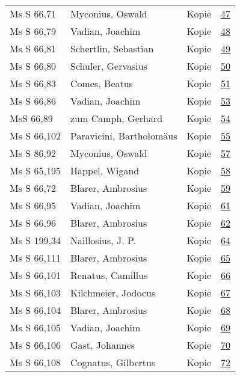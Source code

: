 \documentclass[10pt,a4paper,landscape]{report}
\begin{document}
\begin{longtable}{p{16cm}p{4cm}lr}
Ms S 66,71	&	Myconius, Oswald	&	Kopie	&	\href{http://130.60.24.72/assignment/47}{47}\\
Ms S 66,79	&	Vadian, Joachim	&	Kopie	&	\href{http://130.60.24.72/assignment/48}{48}\\
Ms S 66,81	&	Schertlin, Sebastian	&	Kopie	&	\href{http://130.60.24.72/assignment/49}{49}\\
Ms S 66,80	&	Schuler, Gervasius	&	Kopie	&	\href{http://130.60.24.72/assignment/50}{50}\\
Ms S 66,83	&	Comes, Beatus	&	Kopie	&	\href{http://130.60.24.72/assignment/51}{51}\\
Ms S 66,86	&	Vadian, Joachim	&	Kopie	&	\href{http://130.60.24.72/assignment/53}{53}\\
MsS 66,89	&	zum Camph, Gerhard	&	Kopie	&	\href{http://130.60.24.72/assignment/54}{54}\\
Ms S 66,102	&	Paravicini, Bartholomäus	&	Kopie	&	\href{http://130.60.24.72/assignment/55}{55}\\
Ms S 86,92	&	Myconius, Oswald	&	Kopie	&	\href{http://130.60.24.72/assignment/57}{57}\\
Ms S 65,195	&	Happel, Wigand	&	Kopie	&	\href{http://130.60.24.72/assignment/58}{58}\\
Ms S 66,72	&	Blarer, Ambrosius	&	Kopie	&	\href{http://130.60.24.72/assignment/59}{59}\\
Ms S 66,95	&	Vadian, Joachim	&	Kopie	&	\href{http://130.60.24.72/assignment/61}{61}\\
Ms S 66,96	&	Blarer, Ambrosius	&	Kopie	&	\href{http://130.60.24.72/assignment/62}{62}\\
Ms S 199,34	&	Naillosius, J. P.	&	Kopie	&	\href{http://130.60.24.72/assignment/64}{64}\\
Ms S 66,111	&	Blarer, Ambrosius	&	Kopie	&	\href{http://130.60.24.72/assignment/65}{65}\\
Ms S 66,101	&	Renatus, Camillus	&	Kopie	&	\href{http://130.60.24.72/assignment/66}{66}\\
Ms S 66,103	&	Kilchmeier, Jodocus	&	Kopie	&	\href{http://130.60.24.72/assignment/67}{67}\\
Ms S 66,104	&	Blarer, Ambrosius	&	Kopie	&	\href{http://130.60.24.72/assignment/68}{68}\\
Ms S 66,105	&	Vadian, Joachim	&	Kopie	&	\href{http://130.60.24.72/assignment/69}{69}\\
Ms S 66,106	&	Gast, Johannes	&	Kopie	&	\href{http://130.60.24.72/assignment/70}{70}\\
Ms S 66,108	&	Cognatus, Gilbertus	&	Kopie	&	\href{http://130.60.24.72/assignment/72}{72}\\

\end{longtable}
\end{document}
